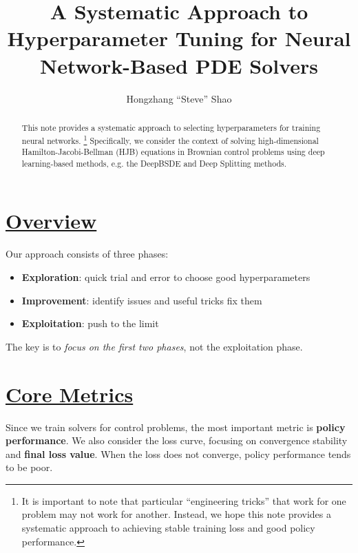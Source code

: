 \documentclass{tufte-handout}
\title{A Systematic Approach to Hyperparameter Tuning for Neural Network-Based PDE Solvers}
\author[Hongzhang ``Steve'' Shao]{Hongzhang ``Steve'' Shao}
\begin{document}
\setlength\parindent{0pt}

\maketitle

\begin{abstract}
This note provides a systematic approach to selecting hyperparameters for training neural networks.
\footnote{It is important to note that particular ``engineering tricks'' that work for one problem may not work for another. Instead, we hope this note provides a systematic approach to achieving stable training loss and good policy performance.}
Specifically, we consider the context of solving high-dimensional Hamilton-Jacobi-Bellman (HJB) equations in Brownian control problems using deep learning-based methods, e.g. the DeepBSDE and Deep Splitting methods. 
\end{abstract}



\section{\underline{Overview}}\label{sec:overview}

Our approach consists of three phases: 
\begin{itemize}
    \item \textbf{Exploration}: quick trial and error to choose good hyperparameters
    \item \textbf{Improvement}: identify issues and useful tricks fix them
    \item \textbf{Exploitation}: push to the limit
\end{itemize}
The key is to \emph{focus on the first two phases}, not the exploitation phase.



\section{\underline{Core Metrics}}\label{sec:core-metrics}

Since we train solvers for control problems, the most important metric is \textbf{policy performance}.
We also consider the loss curve, focusing on convergence stability and \textbf{final loss value}.
When the loss does not converge, policy performance tends to be poor.
\end{document}
